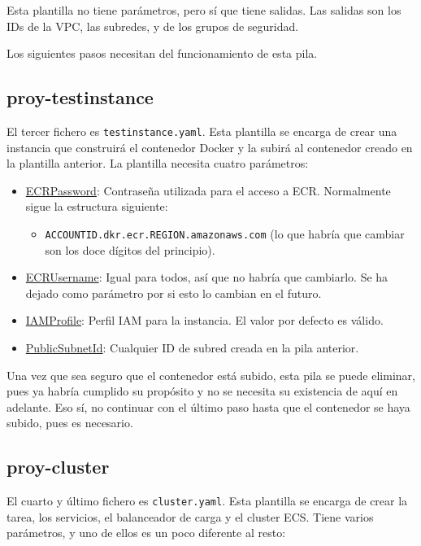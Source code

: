 Esta plantilla no tiene parámetros, pero sí que tiene salidas. Las salidas son los IDs de la VPC, las subredes, y de los grupos de seguridad.

Los siguientes pasos necesitan del funcionamiento de esta pila.

\subsection{proy-testinstance}

El tercer fichero es \texttt{testinstance.yaml}. Esta plantilla se encarga de crear una instancia que construirá el contenedor Docker y la subirá al contenedor creado en la plantilla anterior. La plantilla necesita cuatro parámetros:

\begin{itemize}
    \item \underline{ECRPassword}: Contraseña utilizada para el acceso a ECR. Normalmente sigue la estructura siguiente:
    \begin{itemize}
        \item \texttt{ACCOUNTID.dkr.ecr.REGION.amazonaws.com} (lo que habría que cambiar son los doce dígitos del principio).
    \end{itemize}
    \item \underline{ECRUsername}: Igual para todos, así que no habría que cambiarlo. Se ha dejado como parámetro por si esto lo cambian en el futuro.
    \item \underline{IAMProfile}: Perfil IAM para la instancia. El valor por defecto es válido.
    \item \underline{PublicSubnetId}: Cualquier ID de subred creada en la pila anterior.
\end{itemize}

Una vez que sea seguro que el contenedor está subido, esta pila se puede eliminar, pues ya habría cumplido su propósito y no se necesita su existencia de aquí en adelante. Eso sí, no continuar con el último paso hasta que el contenedor se haya subido, pues es necesario.

\subsection{proy-cluster}

El cuarto y último fichero es \texttt{cluster.yaml}. Esta plantilla se encarga de crear la tarea, los servicios, el balanceador de carga y el cluster ECS. Tiene varios parámetros, y uno de ellos es un poco diferente al resto:

